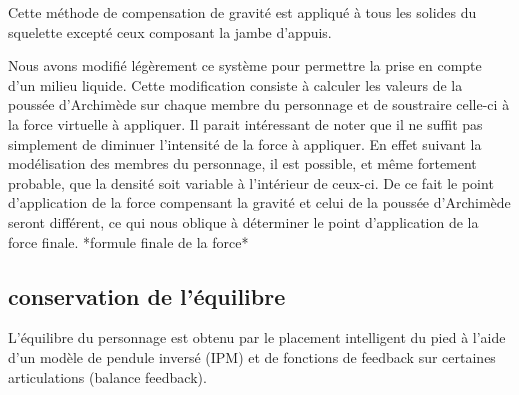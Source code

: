 \documentclass{llncs}
\begin{document}
Cette méthode de compensation de gravité est appliqué à tous les solides du squelette excepté ceux composant la jambe d'appuis.

Nous avons modifié légèrement ce système pour permettre la prise en compte d'un milieu liquide. Cette modification consiste à calculer les valeurs de la poussée d'Archimède sur chaque membre du personnage et de soustraire celle-ci à la force virtuelle à appliquer. Il parait intéressant de noter que il ne suffit pas simplement de diminuer l'intensité de la force à appliquer. En effet suivant la modélisation des membres du personnage, il est possible, et même fortement probable, que la densité soit variable à l'intérieur de ceux-ci. De ce fait le point d'application de la force compensant la gravité et celui de la poussée d'Archimède seront différent, ce qui nous oblique à déterminer le point d'application de la force finale.
*formule finale de la force*
	
\subsection{conservation de l'équilibre}
%
L'équilibre du personnage est obtenu par le placement intelligent du pied à l'aide d'un modèle de pendule inversé (IPM) et de fonctions de feedback sur certaines articulations (balance feedback).
%
\end{document}
